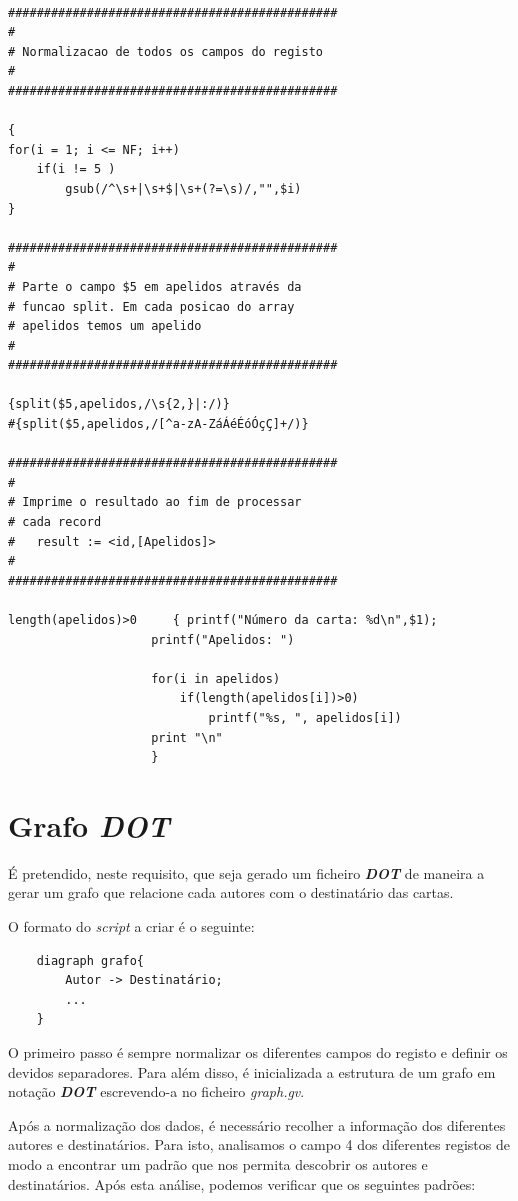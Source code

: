 \documentclass[11pt,a4paper]{report}
\begin{document}
\begin{verbatim}

##############################################
#
# Normalizacao de todos os campos do registo 
#
##############################################

{
for(i = 1; i <= NF; i++)
	if(i != 5 )
      	gsub(/^\s+|\s+$|\s+(?=\s)/,"",$i)
}

##############################################
#
# Parte o campo $5 em apelidos através da 
# funcao split. Em cada posicao do array
# apelidos temos um apelido
#
##############################################

{split($5,apelidos,/\s{2,}|:/)}
#{split($5,apelidos,/[^a-zA-ZáÁéÉóÓçÇ]+/)}

##############################################
#
# Imprime o resultado ao fim de processar 
# cada record
#	result := <id,[Apelidos]>
#
##############################################

length(apelidos)>0	   { printf("Número da carta: %d\n",$1);	
					printf("Apelidos: ")
					
					for(i in apelidos) 
						if(length(apelidos[i])>0)
							printf("%s, ", apelidos[i])
					print "\n" 
					}

\end{verbatim}

\section{Grafo \textit{DOT}}

\qquad É pretendido, neste requisito, que seja gerado um ficheiro \textbf{\textit{DOT}} de maneira a gerar um grafo que relacione cada autores com o destinatário das cartas.

\quad O formato do \textit{script} a criar é o seguinte:

\begin{verbatim}
    diagraph grafo{
        Autor -> Destinatário;
        ...
    }
\end{verbatim}

\quad O primeiro passo é sempre normalizar os diferentes campos do registo e definir os devidos separadores. Para além disso, é inicializada a estrutura de um grafo em notação \textbf{\textit{DOT}} escrevendo-a no ficheiro \textit{graph.gv}.

\quad Após a normalização dos dados, é necessário recolher a informação dos diferentes autores e destinatários. Para isto, analisamos o campo 4 dos diferentes registos de modo a encontrar um padrão que nos permita descobrir os autores e destinatários. Após esta análise, podemos verificar que os seguintes padrões: 
\end{document}
